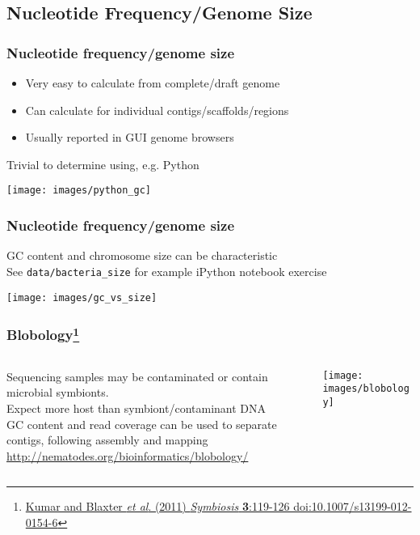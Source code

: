
\subsection{Nucleotide Frequency/Genome Size}

\begin{frame}
  \frametitle{Nucleotide frequency/genome size}
  \begin{itemize}
    \item Very easy to calculate from complete/draft genome
    \item Can calculate for individual contigs/scaffolds/regions
    \item Usually reported in GUI genome browsers
  \end{itemize}    
  Trivial to determine using, e.g. Python
  \begin{center}
    \texttt{[image: images/python\_gc]}
  \end{center}  
\end{frame}

\begin{frame}
  \frametitle{Nucleotide frequency/genome size}
  GC content and chromosome size can be characteristic\\
  See \texttt{data/bacteria\_size} for example iPython notebook exercise\\[0.5cm]
  \begin{center}
    \texttt{[image: images/gc\_vs\_size]}
  \end{center}  
\end{frame}

\begin{frame}
  \frametitle{Blobology\footnote{\tiny{\href{http://dx.doi.org/10.1007/s13199-012-0154-6}{Kumar and Blaxter \textit{et al}. (2011) \textit{Symbiosis} \textbf{3}:119-126 doi:10.1007/s13199-012-0154-6}}}}
  \begin{columns}[T]
    \begin{column}{5cm}
      Sequencing samples may be contaminated or contain microbial symbionts.\\
      Expect more host than symbiont/contaminant DNA\\
      GC content and read coverage can be used to separate contigs, following assembly and mapping\\
      \href{http://nematodes.org/bioinformatics/blobology/}{http://nematodes.org/bioinformatics/blobology/}
    \end{column}
    \begin{column}{5cm}
      \texttt{[image: images/blobology]}
    \end{column}
  \end{columns}
\end{frame}

